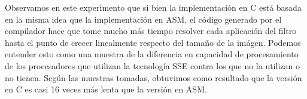 \documentclass[a4paper]{article}
\begin{document}
\begin{centering}
\end{centering}

Observamos en este experimento que si bien la implementación en C está basada en la misma idea que la implementación en ASM,
el código generado por el compilador hace que tome mucho más tiempo resolver cada aplicación del filtro hasta el punto de crecer linealmente
respecto del tamaño de la imágen. Podemos entender esto como una muestra de la diferencia en capacidad de procesamiento de los procesadores que utilizan
la tecnología SSE contra los que no la utilizan o no tienen. Según las muestras tomadas, obtuvimos como resultado que la versión en C es casi 16 veces
más lenta que la versión en ASM.
\end{document}
